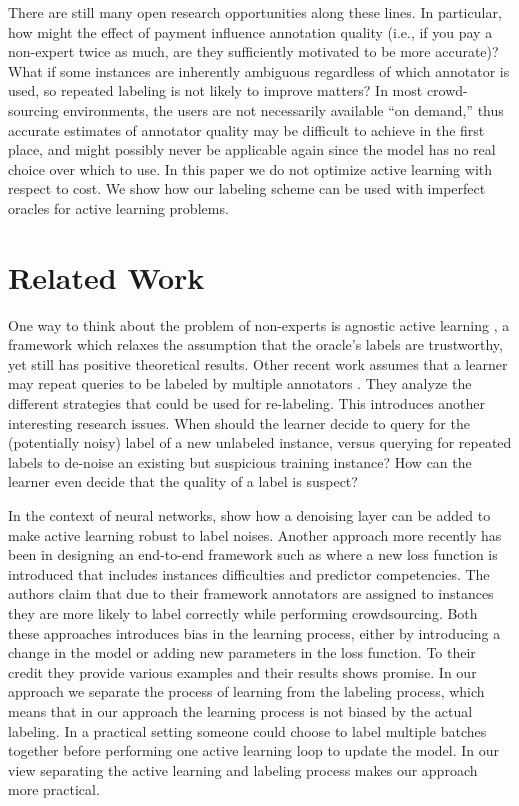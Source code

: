 \documentclass[twoside,11pt]{article}
\begin{document}
There are still many open research opportunities along these lines. In particular, how might the effect of payment influence annotation quality (i.e., if you pay a non-expert twice as much, are they sufficiently motivated to be more accurate)?  What if some instances are inherently ambiguous regardless of which annotator is used, so repeated labeling is not likely to improve matters?  In most crowd-sourcing environments,  the users are not necessarily available  “on  demand,”  thus  accurate  estimates  of  annotator  quality  may  be  difficult  to achieve  in  the  first  place,  and  might  possibly  never  be  applicable  again  since  the  model has no real choice over which to use.  In this paper we do not optimize active learning with respect to cost. We show how our labeling scheme can be used with imperfect oracles for active learning problems.

\section{Related Work}

One way to think about the problem of non-experts is agnostic active learning \cite{balcan2009agnostic}, a framework which relaxes the assumption that the oracle's labels are trustworthy, yet still has positive theoretical results. Other  recent  work  assumes  that  a  learner  may  repeat  queries  to  be  labeled  by  multiple annotators \cite{sheng2008get}. They analyze the different strategies that could be used for re-labeling. This introduces another interesting research issues.  When should the learner decide to query for the (potentially noisy) label of a new unlabeled instance, versus querying for repeated labels to de-noise an existing but suspicious training instance?  How can the learner even decide that the quality of a label is suspect?

In the context of neural networks, \cite{gupta2019learning} show how a denoising layer can be added to make active learning robust to label noises. Another approach more recently has been in designing an end-to-end framework such as \cite{platanios2020learning} where a new loss function is introduced that includes instances difficulties and predictor competencies. The authors claim that due to their framework annotators are assigned to instances they are more likely to label correctly  while performing crowdsourcing. Both these approaches introduces bias in the learning process, either by introducing a change in the model or adding new parameters in the loss function. To their credit they provide various examples and their results shows promise. In our approach we separate the process of learning from the labeling process, which means that in our approach the learning process is not biased by the actual labeling. In a practical setting someone could choose to label multiple batches together before performing one active learning loop to update the model. In our view separating the active learning and labeling process makes our approach more practical.
\end{document}

